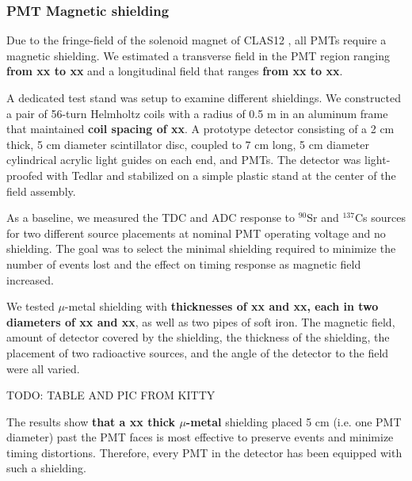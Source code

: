 \documentclass[3p,final,twocolumn]{elsarticle}
\begin{document}
\subsubsection{PMT Magnetic shielding}
Due to the fringe-field of the solenoid magnet of CLAS12 \cite{Fair:2020yfx}, all PMTs require a magnetic shielding. We estimated a transverse field in the  PMT region ranging {\bf from xx to xx} and a longitudinal field that ranges {\bf from xx to xx}.

 A dedicated test stand was setup to examine different shieldings.
We constructed a pair of 56-turn Helmholtz coils with a radius of 0.5 \si{\meter} in an aluminum frame that maintained {\bf coil spacing of xx}. A prototype detector consisting of a 2 \si{\centi\meter} thick, 5 \si{\centi\meter} diameter scintillator disc, coupled to 7 \si{\centi\meter} long, 5 \si{\centi\meter} diameter cylindrical acrylic light guides on each end, and PMTs. The detector was light-proofed with Tedlar and stabilized on a simple plastic stand at the center of the field assembly. 

As a baseline, we measured the TDC and ADC response to $^{90}$Sr and $^{137}$Cs sources for two different source placements at nominal PMT operating voltage and no shielding. 
The goal was to select the minimal shielding required to minimize the number of events lost and the effect on timing response as  magnetic field increased.

We tested $\mu$-metal shielding with {\bf thicknesses of xx and xx, each in two diameters of xx and xx}, as well as two pipes of soft iron. The magnetic field, amount of detector covered by the shielding, the thickness of the shielding, the placement of two radioactive sources, and the angle of the detector to the field were all varied. 


{\color{red}TODO: TABLE AND PIC FROM KITTY}


The results show {\bf that a xx thick $\mu$-metal} shielding placed 5 \si{\centi\meter} (i.e. one PMT diameter) past the PMT faces is most effective to preserve events and minimize timing distortions. Therefore, every PMT in the detector has been equipped with such a shielding. 
\end{document}
